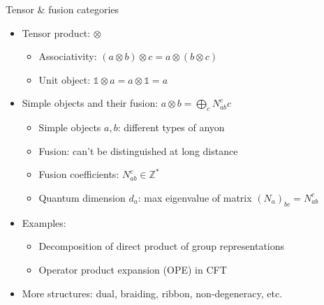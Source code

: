 \documentclass{fdubeamer}
\newcommand{\1}{\mathbb{1}}
\newcommand{\Z}{\mathbb{Z}}
\begin{document}
\begin{frame}{Tensor \& fusion categories}

\begin{itemize}
  \item Tensor product: $\otimes$

    \begin{itemize}
      \item Associativity: $(a\otimes b)\otimes c=a\otimes(b\otimes c)$
      \item Unit object: $\1\otimes a=a\otimes\1=a$
    \end{itemize}

  \item Simple objects and their fusion: $a\otimes b=\bigoplus_c N_{ab}^c c$

    \begin{itemize}
      \item Simple objects $a,b$: different types of anyon
      \item Fusion: can't be distinguished at long distance
      \item Fusion coefficients: $N_{ab}^c\in\Z^*$
      \item Quantum dimension $d_a$: max eigenvalue of matrix $(N_a)_{bc}=N_{ab}^c$
    \end{itemize}

  \item Examples:

    \begin{itemize}
      \item Decomposition of direct product of group representations
      \item Operator product expansion (OPE) in CFT
    \end{itemize}

  \item More structures: dual, braiding, ribbon, non-degeneracy, etc.
\end{itemize}

\end{frame}
\end{document}
